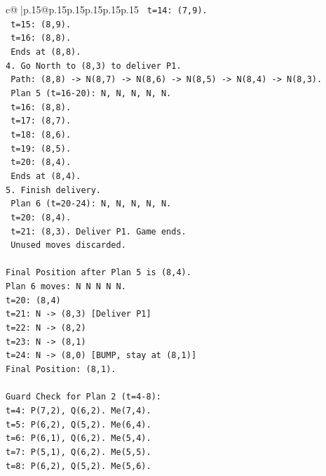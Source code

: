 \documentclass{article}
\begin{document}
{\begin{supertabular}{c@{$\;$}|p{.15\linewidth}@{}p{.15\linewidth}p{.15\linewidth}p{.15\linewidth}p{.15\linewidth}p{.15\linewidth}}
{{{\texttt{     t=14: (7,9).} \\
\texttt{     t=15: (8,9).} \\
\texttt{     t=16: (8,8).} \\
\texttt{     Ends at (8,8).} \\
\texttt{4. Go North to (8,3) to deliver P1.} \\
\texttt{   Path: (8,8) {-}> N(8,7) {-}> N(8,6) {-}> N(8,5) {-}> N(8,4) {-}> N(8,3).} \\
\texttt{   Plan 5 (t=16{-}20): N, N, N, N, N.} \\
\texttt{     t=16: (8,8).} \\
\texttt{     t=17: (8,7).} \\
\texttt{     t=18: (8,6).} \\
\texttt{     t=19: (8,5).} \\
\texttt{     t=20: (8,4).} \\
\texttt{     Ends at (8,4).} \\
\texttt{5. Finish delivery.} \\
\texttt{   Plan 6 (t=20{-}24): N, N, N, N, N.} \\
\texttt{     t=20: (8,4).} \\
\texttt{     t=21: (8,3). Deliver P1. Game ends.} \\
\texttt{     Unused moves discarded.} \\
\\ 
\texttt{Final Position after Plan 5 is (8,4).} \\
\texttt{Plan 6 moves: N N N N N.} \\
\texttt{t=20: (8,4)} \\
\texttt{t=21: N {-}> (8,3) {[}Deliver P1{]}} \\
\texttt{t=22: N {-}> (8,2)} \\
\texttt{t=23: N {-}> (8,1)} \\
\texttt{t=24: N {-}> (8,0) {[}BUMP, stay at (8,1){]}} \\
\texttt{Final Position: (8,1).} \\
\\ 
\texttt{Guard Check for Plan 2 (t=4{-}8):} \\
\texttt{t=4: P(7,2), Q(6,2). Me(7,4).} \\
\texttt{t=5: P(6,2), Q(5,2). Me(6,4).} \\
\texttt{t=6: P(6,1), Q(6,2). Me(5,4).} \\
\texttt{t=7: P(5,1), Q(6,2). Me(5,5).} \\
\texttt{t=8: P(6,2), Q(5,2). Me(5,6).} \\
}}}
\end{supertabular}}
\end{document}
